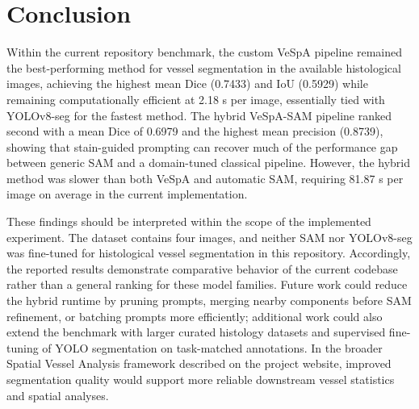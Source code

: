 \section{Conclusion}
Within the current repository benchmark, the custom VeSpA pipeline remained the best-performing method for vessel segmentation in the available histological images, achieving the highest mean Dice (0.7433) and IoU (0.5929) while remaining computationally efficient at 2.18 s per image, essentially tied with YOLOv8-seg for the fastest method. The hybrid VeSpA-SAM pipeline ranked second with a mean Dice of 0.6979 and the highest mean precision (0.8739), showing that stain-guided prompting can recover much of the performance gap between generic SAM and a domain-tuned classical pipeline. However, the hybrid method was slower than both VeSpA and automatic SAM, requiring 81.87 s per image on average in the current implementation.

These findings should be interpreted within the scope of the implemented experiment. The dataset contains four images, and neither SAM nor YOLOv8-seg was fine-tuned for histological vessel segmentation in this repository. Accordingly, the reported results demonstrate comparative behavior of the current codebase rather than a general ranking for these model families. Future work could reduce the hybrid runtime by pruning prompts, merging nearby components before SAM refinement, or batching prompts more efficiently; additional work could also extend the benchmark with larger curated histology datasets and supervised fine-tuning of YOLO segmentation on task-matched annotations. In the broader Spatial Vessel Analysis framework described on the project website, improved segmentation quality would support more reliable downstream vessel statistics and spatial analyses.

